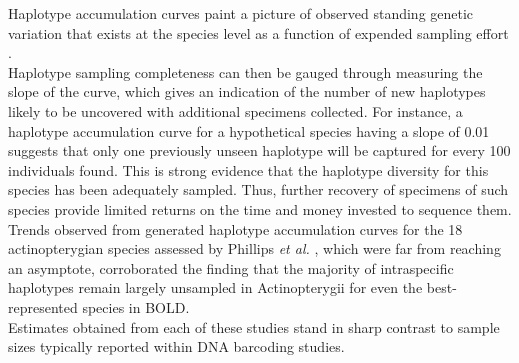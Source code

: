 Haplotype accumulation curves paint a picture of observed standing genetic variation that exists at the species level as a function of expended sampling effort \cite{phillips2019incomplete, phillips2015exploration}. \\ Haplotype sampling completeness can then be gauged through measuring the slope of the curve, which gives an indication of the number of new haplotypes likely to be uncovered with additional specimens collected. For instance, a haplotype accumulation curve for a hypothetical species having a slope of 0.01 suggests that only one previously unseen haplotype will be captured for every 100 individuals found. This is strong evidence that the haplotype diversity for this species has been adequately sampled. Thus, further recovery of specimens of such species provide limited returns on the time and money invested to sequence them. Trends observed from generated haplotype accumulation curves for the 18 actinopterygian species assessed by Phillips \textit{et al.} \cite{phillips2015exploration}, which were far from reaching an asymptote, corroborated the finding that the majority of intraspecific haplotypes remain largely unsampled in Actinopterygii for even the best-represented species in BOLD. \\ Estimates obtained from each of these studies stand in sharp contrast to sample sizes typically reported within DNA barcoding studies. 

